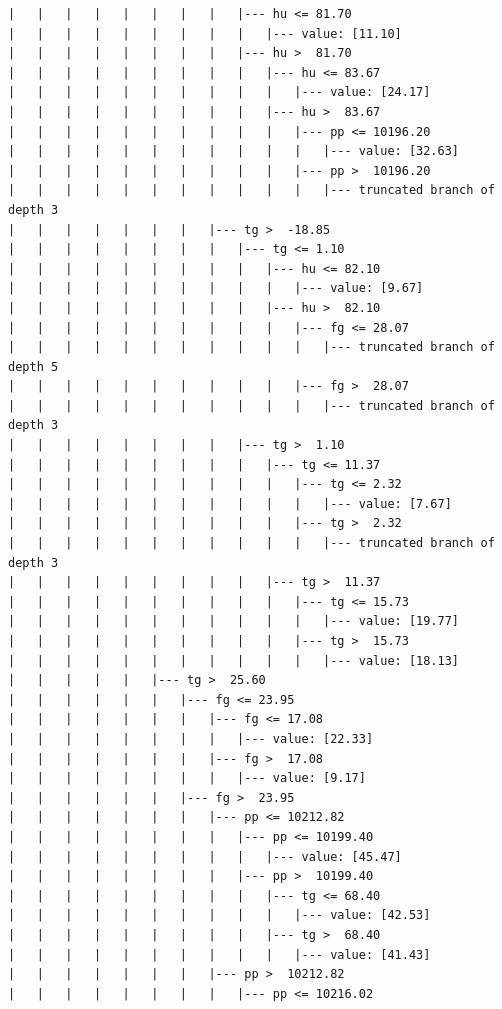\documentclass[UTF8, a4paper]{ctexart}
\begin{document}
\begin{lstlisting}
|   |   |   |   |   |   |   |   |--- hu <= 81.70
|   |   |   |   |   |   |   |   |   |--- value: [11.10]
|   |   |   |   |   |   |   |   |--- hu >  81.70
|   |   |   |   |   |   |   |   |   |--- hu <= 83.67
|   |   |   |   |   |   |   |   |   |   |--- value: [24.17]
|   |   |   |   |   |   |   |   |   |--- hu >  83.67
|   |   |   |   |   |   |   |   |   |   |--- pp <= 10196.20
|   |   |   |   |   |   |   |   |   |   |   |--- value: [32.63]
|   |   |   |   |   |   |   |   |   |   |--- pp >  10196.20
|   |   |   |   |   |   |   |   |   |   |   |--- truncated branch of depth 3
|   |   |   |   |   |   |   |--- tg >  -18.85
|   |   |   |   |   |   |   |   |--- tg <= 1.10
|   |   |   |   |   |   |   |   |   |--- hu <= 82.10
|   |   |   |   |   |   |   |   |   |   |--- value: [9.67]
|   |   |   |   |   |   |   |   |   |--- hu >  82.10
|   |   |   |   |   |   |   |   |   |   |--- fg <= 28.07
|   |   |   |   |   |   |   |   |   |   |   |--- truncated branch of depth 5
|   |   |   |   |   |   |   |   |   |   |--- fg >  28.07
|   |   |   |   |   |   |   |   |   |   |   |--- truncated branch of depth 3
|   |   |   |   |   |   |   |   |--- tg >  1.10
|   |   |   |   |   |   |   |   |   |--- tg <= 11.37
|   |   |   |   |   |   |   |   |   |   |--- tg <= 2.32
|   |   |   |   |   |   |   |   |   |   |   |--- value: [7.67]
|   |   |   |   |   |   |   |   |   |   |--- tg >  2.32
|   |   |   |   |   |   |   |   |   |   |   |--- truncated branch of depth 3
|   |   |   |   |   |   |   |   |   |--- tg >  11.37
|   |   |   |   |   |   |   |   |   |   |--- tg <= 15.73
|   |   |   |   |   |   |   |   |   |   |   |--- value: [19.77]
|   |   |   |   |   |   |   |   |   |   |--- tg >  15.73
|   |   |   |   |   |   |   |   |   |   |   |--- value: [18.13]
|   |   |   |   |   |--- tg >  25.60
|   |   |   |   |   |   |--- fg <= 23.95
|   |   |   |   |   |   |   |--- fg <= 17.08
|   |   |   |   |   |   |   |   |--- value: [22.33]
|   |   |   |   |   |   |   |--- fg >  17.08
|   |   |   |   |   |   |   |   |--- value: [9.17]
|   |   |   |   |   |   |--- fg >  23.95
|   |   |   |   |   |   |   |--- pp <= 10212.82
|   |   |   |   |   |   |   |   |--- pp <= 10199.40
|   |   |   |   |   |   |   |   |   |--- value: [45.47]
|   |   |   |   |   |   |   |   |--- pp >  10199.40
|   |   |   |   |   |   |   |   |   |--- tg <= 68.40
|   |   |   |   |   |   |   |   |   |   |--- value: [42.53]
|   |   |   |   |   |   |   |   |   |--- tg >  68.40
|   |   |   |   |   |   |   |   |   |   |--- value: [41.43]
|   |   |   |   |   |   |   |--- pp >  10212.82
|   |   |   |   |   |   |   |   |--- pp <= 10216.02

\end{lstlisting}
\end{document}
